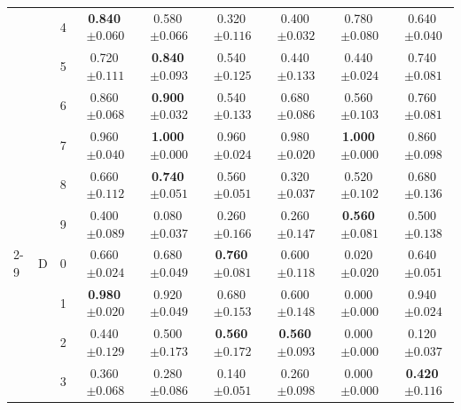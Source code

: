 \begin{longtable}{lllcccccc}
 &  & 4 & \textbf{0.840}$\,{\scriptstyle\pm0.060}$ & 0.580$\,{\scriptstyle\pm0.066}$ & 0.320$\,{\scriptstyle\pm0.116}$ & 0.400$\,{\scriptstyle\pm0.032}$ & 0.780$\,{\scriptstyle\pm0.080}$ & 0.640$\,{\scriptstyle\pm0.040}$ \\
 &  & 5 & 0.720$\,{\scriptstyle\pm0.111}$ & \textbf{0.840}$\,{\scriptstyle\pm0.093}$ & 0.540$\,{\scriptstyle\pm0.125}$ & 0.440$\,{\scriptstyle\pm0.133}$ & 0.440$\,{\scriptstyle\pm0.024}$ & 0.740$\,{\scriptstyle\pm0.081}$ \\
 &  & 6 & 0.860$\,{\scriptstyle\pm0.068}$ & \textbf{0.900}$\,{\scriptstyle\pm0.032}$ & 0.540$\,{\scriptstyle\pm0.133}$ & 0.680$\,{\scriptstyle\pm0.086}$ & 0.560$\,{\scriptstyle\pm0.103}$ & 0.760$\,{\scriptstyle\pm0.081}$ \\
 &  & 7 & 0.960$\,{\scriptstyle\pm0.040}$ & \textbf{1.000}$\,{\scriptstyle\pm0.000}$ & 0.960$\,{\scriptstyle\pm0.024}$ & 0.980$\,{\scriptstyle\pm0.020}$ & \textbf{1.000}$\,{\scriptstyle\pm0.000}$ & 0.860$\,{\scriptstyle\pm0.098}$ \\
 &  & 8 & 0.660$\,{\scriptstyle\pm0.112}$ & \textbf{0.740}$\,{\scriptstyle\pm0.051}$ & 0.560$\,{\scriptstyle\pm0.051}$ & 0.320$\,{\scriptstyle\pm0.037}$ & 0.520$\,{\scriptstyle\pm0.102}$ & 0.680$\,{\scriptstyle\pm0.136}$ \\
 &  & 9 & 0.400$\,{\scriptstyle\pm0.089}$ & 0.080$\,{\scriptstyle\pm0.037}$ & 0.260$\,{\scriptstyle\pm0.166}$ & 0.260$\,{\scriptstyle\pm0.147}$ & \textbf{0.560}$\,{\scriptstyle\pm0.081}$ & 0.500$\,{\scriptstyle\pm0.138}$ \\
\cmidrule(lr){2-9}
 & D & 0 & 0.660$\,{\scriptstyle\pm0.024}$ & 0.680$\,{\scriptstyle\pm0.049}$ & \textbf{0.760}$\,{\scriptstyle\pm0.081}$ & 0.600$\,{\scriptstyle\pm0.118}$ & 0.020$\,{\scriptstyle\pm0.020}$ & 0.640$\,{\scriptstyle\pm0.051}$ \\
 &  & 1 & \textbf{0.980}$\,{\scriptstyle\pm0.020}$ & 0.920$\,{\scriptstyle\pm0.049}$ & 0.680$\,{\scriptstyle\pm0.153}$ & 0.600$\,{\scriptstyle\pm0.148}$ & 0.000$\,{\scriptstyle\pm0.000}$ & 0.940$\,{\scriptstyle\pm0.024}$ \\
 &  & 2 & 0.440$\,{\scriptstyle\pm0.129}$ & 0.500$\,{\scriptstyle\pm0.173}$ & \textbf{0.560}$\,{\scriptstyle\pm0.172}$ & \textbf{0.560}$\,{\scriptstyle\pm0.093}$ & 0.000$\,{\scriptstyle\pm0.000}$ & 0.120$\,{\scriptstyle\pm0.037}$ \\
 &  & 3 & 0.360$\,{\scriptstyle\pm0.068}$ & 0.280$\,{\scriptstyle\pm0.086}$ & 0.140$\,{\scriptstyle\pm0.051}$ & 0.260$\,{\scriptstyle\pm0.098}$ & 0.000$\,{\scriptstyle\pm0.000}$ & \textbf{0.420}$\,{\scriptstyle\pm0.116}$ \\

\end{longtable}
